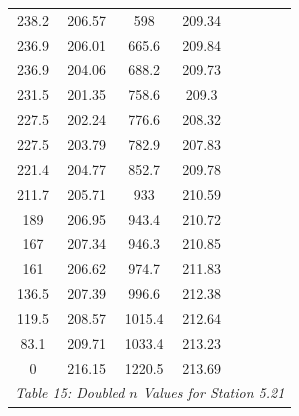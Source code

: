 \begin{center}
\begin{tabular}{|cccc|cc|cc|}
    238.2    & 206.57                  & 598    & 209.34                      &        &                             &          &                                    \\
    236.9    & 206.01                  & 665.6  & 209.84                      &        &                             &          &                                    \\
    236.9    & 204.06                  & 688.2  & 209.73                      &        &                             &          &                                    \\
    231.5    & 201.35                  & 758.6  & 209.3                       &        &                             &          &                                    \\
    227.5    & 202.24                  & 776.6  & 208.32                      &        &                             &          &                                    \\
    227.5    & 203.79                  & 782.9  & 207.83                      &        &                             &          &                                    \\
    221.4    & 204.77                  & 852.7  & 209.78                      &        &                             &          &                                    \\
    211.7    & 205.71                  & 933    & 210.59                      &        &                             &          &                                    \\
    189      & 206.95                  & 943.4  & 210.72                      &        &                             &          &                                    \\
    167      & 207.34                  & 946.3  & 210.85                      &        &                             &          &                                    \\
    161      & 206.62                  & 974.7  & 211.83                      &        &                             &          &                                    \\
    136.5    & 207.39                  & 996.6  & 212.38                      &        &                             &          &                                    \\
    119.5    & 208.57                  & 1015.4 & 212.64                      &        &                             &          &                                    \\
    83.1     & 209.71                  & 1033.4 & 213.23                      &        &                             &          &                                    \\
    0        & 216.15                  & 1220.5 & 213.69                      &        &                             &          &                                    \\
    \hline\multicolumn{8}{c}{\emph{Table 15: Doubled $n$ Values for Station 5.21}}
\end{tabular}
\end{center}
